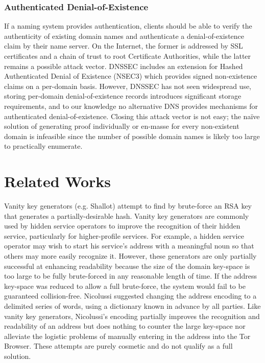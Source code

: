 \documentclass[conference]{IEEEtran}
\begin{document}

\subsubsection{Authenticated Denial-of-Existence}
\label{sec:authDenialIntro}

If a naming system provides authentication, clients should be able to verify the authenticity of existing domain names and authenticate a denial-of-existence claim by their name server. On the Internet, the former is addressed by SSL certificates and a chain of trust to root Certificate Authorities, while the latter remains a possible attack vector. DNSSEC includes an extension for Hashed Authenticated Denial of Existence (NSEC3) which provides signed non-existence claims on a per-domain basis. However, DNSSEC has not seen widespread use, storing per-domain denial-of-existence records introduces significant storage requirements, and to our knowledge no alternative DNS provides mechanisms for authenticated denial-of-existence. Closing this attack vector is not easy; the na\"{i}ve solution of generating proof individually or en-masse for every non-existent domain is infeasible since the number of possible domain names is likely too large to practically enumerate.

\section{Related Works}
\label{sec:RelatedWorks}

Vanity key generators (e.g. Shallot\cite{KatmagicShallot}) attempt to find by brute-force an RSA key that generates a partially-desirable hash. Vanity key generators are commonly used by hidden service operators to improve the recognition of their hidden service, particularly for higher-profile services\cite{syversongenuine}. For example, a hidden service operator may wish to start his service's address with a meaningful noun so that others may more easily recognize it. However, these generators are only partially successful at enhancing readability because the size of the domain key-space is too large to be fully brute-forced in any reasonable length of time. If the address key-space was reduced to allow a full brute-force, the system would fail to be guaranteed collision-free. Nicolussi suggested changing the address encoding to a delimited series of words, using a dictionary known in advance by all parties\cite{nicolussi2011human}. Like vanity key generators, Nicolussi's encoding partially improves the recognition and readability of an address but does nothing to counter the large key-space nor alleviate the logistic problems of manually entering in the address into the Tor Browser. These attempts are purely cosmetic and do not qualify as a full solution.
\end{document}

